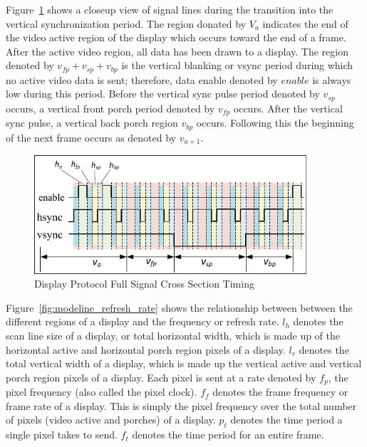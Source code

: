 
    Figure~\ref{fig:display_protocol_full_cross} shows a closeup view of signal lines during the transition into the vertical synchronization period. The region donated by $V_a$ indicates the end of the video active region of the display which occurs toward the end of a frame. After the active video region, all data has been drawn to a display. The region denoted by $v_{fp}+v_{sp}+v_{bp}$ is the vertical blanking or vsync period during which no active video data is sent; therefore, data enable denoted by $enable$ is always low during this period. Before the vertical sync pulse period denoted by $v_{sp}$ occurs, a vertical front porch period denoted by $v_{fp}$ occurs. After the vertical sync pulse, a vertical back porch region $v_{bp}$ occurs. Following this the beginning of the next frame occurs as denoted by $v_{a+1}$.

    \begin{figure}
        \centering
        \includegraphics[width=0.9\textwidth]{fig/display_timing_full_cross.pdf}
        \caption{Display Protocol Full Signal Cross Section Timing}
        \label{fig:display_protocol_full_cross}
    \end{figure}

    Figure~\ref{fig:modeline_refresh_rate} shows the relationship between between the different regions of a display and the frequency or refresh rate. $l_h$ denotes the scan line size of a display, or total horizontal width, which is made up of the horizontal active and horizontal porch region pixels of a display. $l_v$ denotes the total vertical width of a display, which is made up the vertical active and vertical porch region pixels of a display. Each pixel is sent at a rate denoted by $f_p$, the pixel frequency (also called the pixel clock). $f_f$ denotes the frame frequency or frame rate of a display. This is simply the pixel frequency over the total number of pixels (video active and porches) of a display. $p_t$ denotes the time period a single pixel takes to send. $f_t$ denotes the time period for an entire frame.

